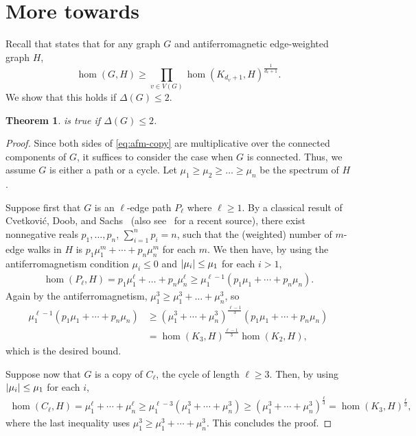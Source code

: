 \documentclass{article}
\numberwithin{equation}{section}
\theoremstyle{plain}
\newtheorem{theorem}{Theorem}[section]
\theoremstyle{definition}
\theoremstyle{remark} %
\DeclarePairedDelimiter{\abs}{\lvert}{\rvert}
\begin{document}
\section{More towards~\texorpdfstring{}{Conjecture~\ref{conj:main}}}
Recall that  states that for any graph \(G\) and antiferromagnetic edge-weighted graph \(H\),
\begin{equation}\label{eq:afm-copy}
    \hom(G,H)\ge \prod_{v\in V(G)} \hom(K_{d_v+1},H)^{\frac{1}{d_v+1}}.
\end{equation}
We show that this holds if \(\Delta(G)\le 2\).
\begin{theorem}\label{thm:conj-main-deg<=2}
     is true if \(\Delta(G)\le 2\).
\end{theorem}
\begin{proof}
    Since both sides of \eqref{eq:afm-copy} are multiplicative over the connected components of \(G\), it suffices to consider the case when \(G\) is connected. Thus, we assume \(G\) is either a path or a cycle.
    Let $\mu_1\geq \mu_2\geq\dots\geq \mu_n$ be the spectrum of $H$.

    Suppose first that $G$ is an $\ell$-edge path $P_\ell$ where \(\ell\ge1\).
    By a classical result of Cvetkovi\'{c}, Doob, and Sachs~\cite[Theorem~1.10]{cvetkovic1980spectra} (also see~\cite[Theorem~1.3.5]{cvetkovic2010introduction} for a recent source), there exist nonnegative reals $p_1,\dots,p_n$, $\sum_{i=1}^n p_i=n$, such that the (weighted) number of $m$-edge walks in $H$ is $p_1\mu_1^m+\cdots+p_n\mu_n^m$ for each $m$. We then have, by using the antiferromagnetism condition $\mu_i\leq 0$ and \(\abs{\mu_i}\le \mu_1\) for each $i>1$,
    \begin{align*}
        \hom(P_\ell,H)=p_1\mu_1^\ell +\dots +p_n\mu_n^\ell\geq \mu_1^{\ell-1}(p_1\mu_1+\cdots+p_n\mu_n).
    \end{align*}
    Again by the antiferromagnetism, $\mu_1^3 \geq \mu_1^3 +\dots +\mu_n^3$, so
    \begin{align*}
        \mu_1^{\ell-1}(p_1\mu_1+\cdots+p_n\mu_n)
        &\geq (\mu_1^3+\cdots+\mu_n^3)^{\frac{\ell-1}{3}}(p_1\mu_1 +\cdots + p_n\mu_n)\\
        &=\hom(K_3,H)^{\frac{\ell-1}{3}}\hom(K_2,H),
    \end{align*}
    which is the desired bound.

    Suppose now that $G$ is a copy of $C_\ell$, the cycle of length $\ell\geq 3$. Then, by using $\abs{\mu_i}\le \mu_1$ for each $i$,
     \begin{align*}
        \hom(C_\ell,H)=\mu_1^\ell +\cdots + \mu_n^\ell \geq \mu_1^{\ell-3}(\mu_1^3 +\cdots + \mu_n^3) \geq (\mu_1^3 +\cdots +\mu_n^3)^{\frac{\ell}{3}} = \hom(K_3,H)^{\frac{\ell}{3}},
    \end{align*}
    where the last inequality uses $\mu_1^3\geq \mu_1^3 +\cdots +\mu_n^3$. This concludes the proof.
\end{proof}
\end{document}
